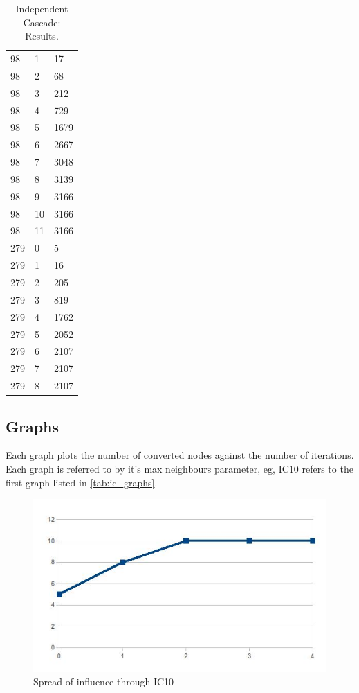 \begin{table}
\begin{tabular}{|l|l|l|}
98 & 1 & 17 \\
98 & 2 & 68 \\
98 & 3 & 212 \\
98 & 4 & 729 \\
98 & 5 & 1679 \\
98 & 6 & 2667 \\
98 & 7 & 3048 \\
98 & 8 & 3139 \\
98 & 9 & 3166 \\
98 & 10 & 3166 \\
98 & 11 & 3166 \\
\hline
279 & 0 & 5 \\
279 & 1 & 16 \\
279 & 2 & 205 \\
279 & 3 & 819 \\
279 & 4 & 1762 \\
279 & 5 & 2052 \\
279 & 6 & 2107 \\
279 & 7 & 2107 \\
279 & 8 & 2107 \\
\hline
\end{tabular}
\caption{Independent Cascade: Results.}
\label{tab:ic_results}
\end{table}

\subsection{Graphs}

Each graph plots the number of converted nodes against the number of iterations. Each graph is referred to by it's max neighbours parameter, eg, IC10 refers to the first graph listed in \ref{tab:ic_graphs}.

\begin{figure}[htbp]%
\centering
\includegraphics[]{./img/ic10}%
\caption{Spread of influence through IC10}%
\label{fig:ic10}%
\end{figure}

